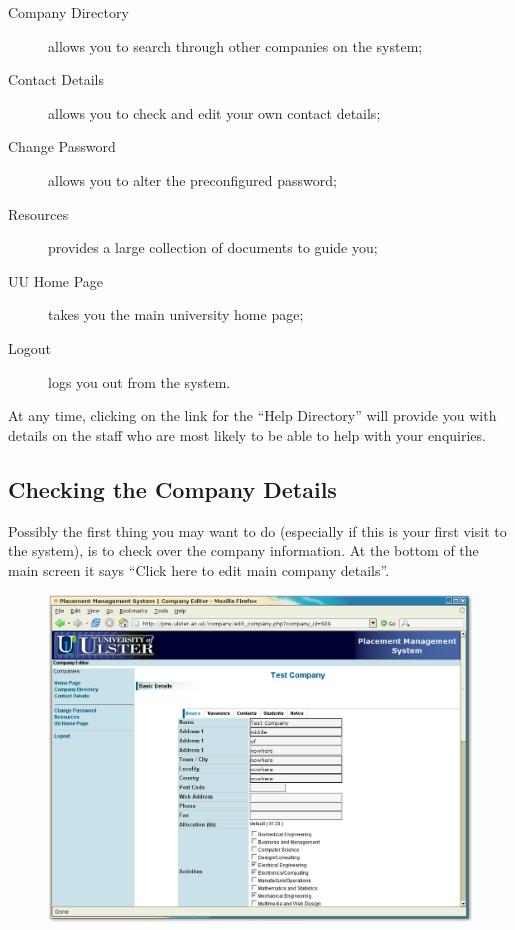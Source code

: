 \begin{description}
\item[Company Directory] allows you to search through other companies on the system;
\item[Contact Details] allows you to check and edit your own contact details;
\item[Change Password] allows you to alter the preconfigured password;
\item[Resources] provides a large collection of documents to guide you;
\item[UU Home Page] takes you the main university home page;
\item[Logout] logs you out from the system.
\end{description}

At any time, clicking on the link for the ``Help Directory'' will
provide you with details on the staff who are most likely to be
able to help with your enquiries.


\subsection{Checking the Company Details}

Possibly the first thing you may want to do (especially if this is your first visit to
the system), is to check over the company information. At the bottom of the main screen
it says ``Click here to edit main company details''.

\begin{figure}[htb]
\begin{center}
\includegraphics[scale=0.25]{png/company_hr2.png}
\end{center}
\end{figure}


